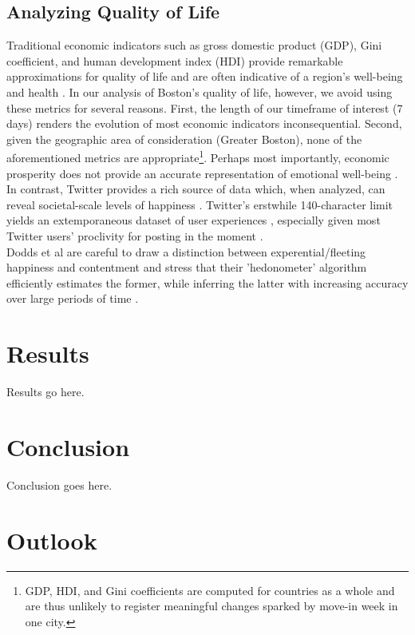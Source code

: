 \documentclass[journal, a4paper]{IEEEtran}
\begin{document}
\subsection{Analyzing Quality of Life}
Traditional economic indicators such as gross domestic product (GDP), Gini coefficient, and human development index (HDI) provide remarkable approximations for quality of life and are often indicative of a region's well-being and health \cite{gallup}\cite{wellbgallup}. In our analysis of Boston's quality of life, however, we avoid using these metrics for several reasons. First, the length of our timeframe of interest (7 days) renders the evolution of most economic indicators inconsequential. Second, given the geographic area of consideration (Greater Boston), none of the aforementioned metrics are appropriate\footnote{GDP, HDI, and Gini coefficients are computed for countries as a whole and are thus unlikely to register meaningful changes sparked by move-in week in one city.}. Perhaps most importantly, economic prosperity does not provide an accurate representation of emotional well-being \cite{wellbgallup}. 
\\In contrast, Twitter provides a rich source of data which, when analyzed, can reveal societal-scale levels of happiness \cite{happytexttwitter}. Twitter's erstwhile 140-character limit yields an extemporaneous dataset of user experiences \cite{moralsc}, especially given most Twitter users' proclivity for posting in the moment \cite{twtrends}\cite{mtwtrends}.
\\Dodds et al are careful to draw a distinction between experential/fleeting happiness and contentment and stress that their 'hedonometer' algorithm efficiently estimates the former, while inferring the latter with increasing accuracy over large periods of time \cite{happytext}.
\\
\section{Results}
Results go here.
\section{Conclusion}
Conclusion goes here.
\section{Outlook}
\end{document}
